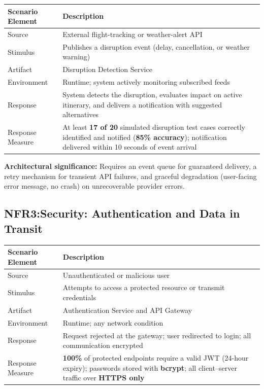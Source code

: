 \documentclass[12pt,a4paper]{article}
\begin{document}
\begin{tabularx}{\textwidth}{L{3.5cm}X}
\toprule
\textbf{Scenario Element} & \textbf{Description} \\
\midrule
Source            & External flight-tracking or weather-alert API \\
Stimulus          & Publishes a disruption event (delay, cancellation, or weather warning) \\
Artifact          & Disruption Detection Service \\
Environment       & Runtime; system actively monitoring subscribed feeds \\
Response          & System detects the disruption, evaluates impact on active itinerary, and
                    delivers a notification with suggested alternatives \\
Response Measure  & At least \textbf{17 of 20} simulated disruption test cases correctly
                    identified and notified (\textbf{85\% accuracy}); notification delivered
                    within 10 seconds of event arrival \\
\bottomrule
\end{tabularx}

\textbf{Architectural significance:} Requires an event queue for guaranteed delivery, a retry
mechanism for transient API failures, and graceful degradation (user-facing error message, no
crash) on unrecoverable provider errors.

\vspace{1em}

\subsection{NFR3:Security: Authentication and Data in Transit}

\begin{tabularx}{\textwidth}{L{3.5cm}X}
\toprule
\textbf{Scenario Element} & \textbf{Description} \\
\midrule
Source            & Unauthenticated or malicious user \\
Stimulus          & Attempts to access a protected resource or transmit credentials \\
Artifact          & Authentication Service and API Gateway \\
Environment       & Runtime; any network condition \\
Response          & Request rejected at the gateway; user redirected to login; all
                    communication encrypted \\
Response Measure  & \textbf{100\%} of protected endpoints require a valid JWT (24-hour expiry);
                    passwords stored with \textbf{bcrypt}; all client--server traffic over
                    \textbf{HTTPS only} \\
\bottomrule
\end{tabularx}
\end{document}
